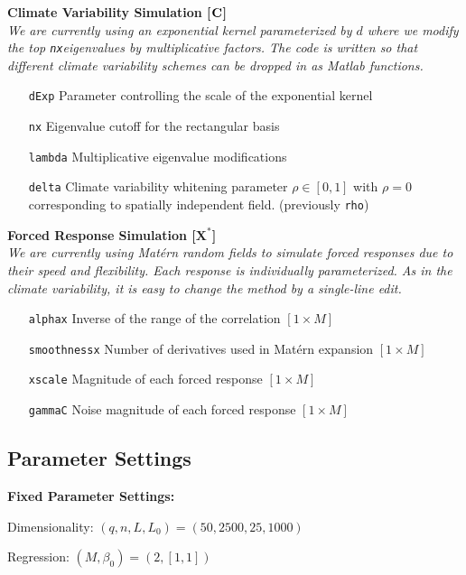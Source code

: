 \documentclass[11pt]{article}
\newcommand{\C}{\ensuremath{\text{Cov}}}
\def\*#1{\bm{#1}}
\def\C{\textbf{\text{C}}}
\begin{document}
\textbf{Climate Variability Simulation [$\C$]}\\
\emph{We are currently using an exponential kernel parameterized by $d$ where we modify the top \texttt{nx}eigenvalues by multiplicative factors. The code is written so that different climate variability schemes can be dropped in as Matlab functions.}
\begin{itemize}
\item[ \texttt{dExp}] Parameter controlling the scale of the exponential kernel
\item[\texttt{nx}] Eigenvalue cutoff for the rectangular basis
\item[\texttt{lambda}] Multiplicative eigenvalue modifications
\item[\texttt{delta}] Climate variability whitening parameter $\rho \in [0,1]$ with $\rho=0$ corresponding to spatially independent field. (previously \texttt{rho})
\end{itemize}

\textbf{Forced Response Simulation [$\*X^*$]} \\
\emph{We are currently using Mat\'ern random fields to simulate forced responses due to their speed and flexibility. Each response is individually parameterized. As in the climate variability, it is easy to change the method by a single-line edit.}
\begin{itemize}
\item[ \texttt{alphax}] Inverse of the range of the correlation $[1 \times M]$
\item[\texttt{smoothnessx}] Number of derivatives used in Mat\'ern expansion $[1 \times M]$
\item[\texttt{xscale}] Magnitude of each forced response $[1 \times M]$
\item[\texttt{gammaC}] Noise magnitude of each forced response $[1 \times M]$
\end{itemize}


\clearpage
\subsection{Parameter Settings}
\textbf{Fixed Parameter Settings:} 

Dimensionality: $(q,n,L,L_0) = (50,2500,25,1000)$

Regression: $(M,\beta_0) = (2,[1,1])$
\end{document}

